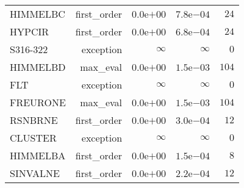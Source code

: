 \begin{longtable}[c]{lrrrr}
HIMMELBC & first\_order & \( 0.0\)e\(+00\) & \( 7.8\)e\(-04\) & \(   24\) \\
HYPCIR & first\_order & \( 0.0\)e\(+00\) & \( 6.8\)e\(-04\) & \(   24\) \\
S316-322 & exception & \(\infty\) & \(\infty\) & \(    0\) \\
HIMMELBD & max\_eval & \( 0.0\)e\(+00\) & \( 1.5\)e\(-03\) & \(  104\) \\
FLT & exception & \(\infty\) & \(\infty\) & \(    0\) \\
FREURONE & max\_eval & \( 0.0\)e\(+00\) & \( 1.5\)e\(-03\) & \(  104\) \\
RSNBRNE & first\_order & \( 0.0\)e\(+00\) & \( 3.0\)e\(-04\) & \(   12\) \\
CLUSTER & exception & \(\infty\) & \(\infty\) & \(    0\) \\
HIMMELBA & first\_order & \( 0.0\)e\(+00\) & \( 1.5\)e\(-04\) & \(    8\) \\
SINVALNE & first\_order & \( 0.0\)e\(+00\) & \( 2.2\)e\(-04\) & \(   12\) \\
\hline 
\end{longtable}
